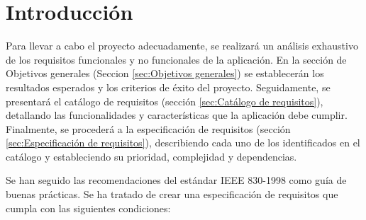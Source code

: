 
\section{Introducción}

Para llevar a cabo el proyecto adecuadamente, se realizará un análisis exhaustivo de los requisitos funcionales y no funcionales de la aplicación. En la sección de Objetivos generales (Seccion \ref{sec:Objetivos generales}) se establecerán los resultados esperados y los criterios de éxito del proyecto. Seguidamente, se presentará el catálogo de requisitos (sección \ref{sec:Catálogo de requisitos}), detallando las funcionalidades y características que la aplicación debe cumplir. Finalmente, se procederá a la especificación de requisitos (sección \ref{sec:Especificación de requisitos}), describiendo cada uno de los identificados en el catálogo y estableciendo su prioridad, complejidad y dependencias.

Se han seguido las recomendaciones del estándar IEEE 830-1998\citep{1998IEEESpecifications} como guía de buenas prácticas. Se ha tratado de crear una especificación de requisitos
 que cumpla con las siguientes condiciones:

